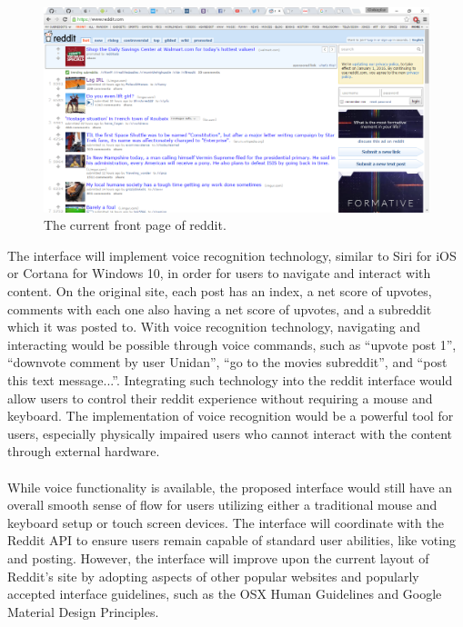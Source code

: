 \documentclass{article}
\begin{document}
\begin{figure}[H]
\begin{center}
\includegraphics[width=1\textwidth]{reddit.png}
\caption{The current front page of reddit.}
\end{center}
\end{figure}

\indent The interface will implement voice recognition technology, similar to Siri for iOS or Cortana for Windows 10, in order for users to navigate and interact with content. On the original site, each post has an index, a net score of upvotes, comments with each one also having a net score of upvotes, and a subreddit which it was posted to. With voice recognition technology, navigating and interacting would be possible through voice commands, such as ``upvote post 1'', ``downvote comment by user Unidan'', ``go to the movies subreddit'', and ``post this text message...''. Integrating such technology into the reddit interface would allow users to control their reddit experience without requiring a mouse and keyboard. The implementation of voice recognition would be a powerful tool for users, especially physically impaired users who cannot interact with the content through external hardware.\\
\\
\indent While voice functionality is available, the proposed interface would still have an overall smooth sense of flow for users utilizing either a traditional mouse and keyboard setup or touch screen devices. The interface will coordinate with the Reddit API to ensure users remain capable of standard user abilities, like voting and posting. However, the interface will improve upon the current layout of Reddit's site by adopting aspects of other popular websites and popularly accepted interface guidelines, such as the OSX Human Guidelines and Google Material Design Principles.
\end{document}
